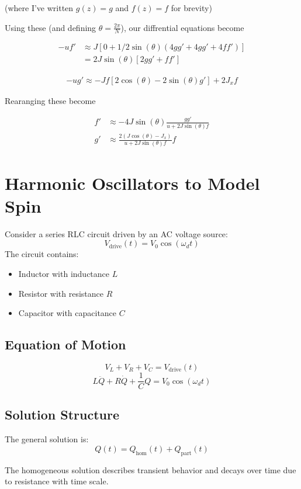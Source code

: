 \documentclass{article}
\begin{document}
(where I've written $g(z) = g$ and $f(z) = f$ for brevity)

Using these (and defining $\theta = \frac{2\pi}{N}$), our diffrential equations become

\begin{align*}
    -uf' &\approx J[0 +1/2\sin(\theta)(4gg' + 4gg' + 4ff')] \\
            &= 2J\sin(\theta)[2gg' + ff']
\end{align*}

\begin{align*}
    -ug' \approx -Jf[2\cos(\theta) - 2\sin(\theta)g'] + 2J_xf
\end{align*}

Rearanging these become

\begin{align*}
    f' &\approx -4J\sin(\theta)\frac{gg'}{u + 2J\sin(\theta)f} \\
    g' &\approx \frac{2(J\cos(\theta) - J_x)}{u + 2J\sin(\theta)f}f
\end{align*}

\section{Harmonic Oscillators to Model Spin}

Consider a series RLC circuit driven by an AC voltage source:
\[
V_{\text{drive}}(t) = V_0 \cos(\omega_d t)
\]
The circuit contains:
\begin{itemize}
  \item Inductor with inductance $L$
  \item Resistor with resistance $R$
  \item Capacitor with capacitance $C$
\end{itemize}

\subsection{Equation of Motion}
\[
V_L + V_R + V_C = V_{\text{drive}}(t)
\]
\[
\boxed{L \ddot{Q} + R \dot{Q} + \frac{1}{C} Q = V_0 \cos(\omega_d t)}
\]

\subsection{Solution Structure}

The general solution is:
\[
Q(t) = Q_{\text{hom}}(t) + Q_{\text{part}}(t)
\]

The homogeneous solution describes transient behavior and decays over time due to resistance with time scale.
\end{document}
